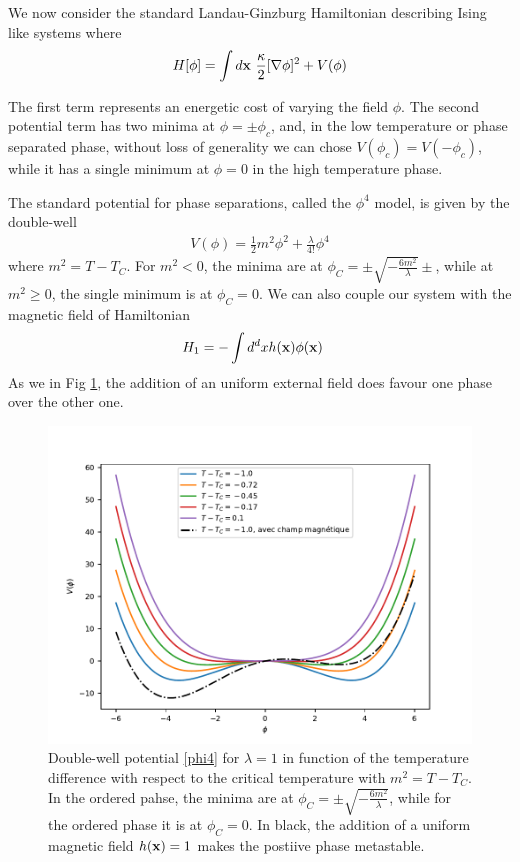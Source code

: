We now consider the standard Landau-Ginzburg Hamiltonian  \cite{l_landau_physique_1990} describing Ising like systems where
\begin{equation}
    H[\phi] = \int d{\bf x} \ \frac{\kappa}{2}[\nabla \phi]^2 + V(\phi)
    \label{landau-ginzburg-hamiltonian}
\end{equation}
{\color{blue}
The first term represents an energetic cost of varying the field $\phi$. The second potential term has two minima at $\phi=\pm \phi_c$, and, in the low temperature or phase separated phase, without loss of generality we can chose  $V(\phi_c)=V(-\phi_c)$, while it has a single minimum at $\phi=0$ in the high temperature phase.

The standard potential for phase separations, called the $\phi^4$ model, is given by the double-well
\begin{align}
    V(\phi) = \frac{1}{2} m^2 \phi^2 + \frac{\lambda}{4!} \phi^4
    \label{phi4}
\end{align} 
where $m^2 = T-T_C$. For $m^2 \less 0$, the minima are at $\phi_C = \pm \sqrt{- \frac{6 m^2}{\lambda} } \pm$, while at $m^2 \ge 0$, the single minimum is at $\phi_C = 0$. We can also couple our system with the magnetic field of Hamiltonian
\begin{align}
    H_1 &= - \int d^dx h({\bf x})\phi({\bf x})
    \label{champ-externe}
\end{align}
As we in Fig \ref{double-puits-temperature}, the addition of an uniform external field does favour one phase over the other one.
}

\begin{figure}
    \centering
    \includegraphics[width=0.6\linewidth]{intro/double-puit-en-fonction-temp.pdf}
    \caption{Double-well potential \eqref{phi4} for $\lambda=1$ in function of the temperature difference with respect to the critical temperature with $m^2 = T-T_C$. In the ordered pahse, the minima are at $\phi_C =\pm \sqrt{- \frac{6 m^2}{\lambda} } $, while for the ordered phase it is at $\phi_C = 0$. In black, the addition of a uniform magnetic field  $h({\bf x}) = 1$ makes the postiive phase metastable.}
    \label{double-puits-temperature}
\end{figure}

